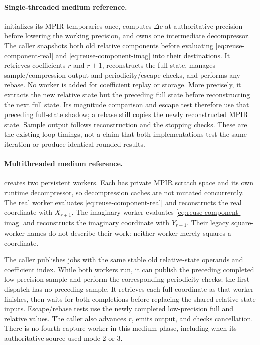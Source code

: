 \paragraph{Single-threaded medium reference.}
 initializes its MPIR
temporaries once, computes $\Delta c$ at authoritative precision before
lowering the working precision, and owns one intermediate decompressor.
The caller snapshots both old relative components before evaluating
\eqref{eq:reuse-component-real} and \eqref{eq:reuse-component-imag} into their
destinations. It retrieves coefficients $r$ and $r+1$, reconstructs the full
state, manages sample/compression output and periodicity/escape checks, and
performs any rebase. No worker is added for coefficient replay or storage.
More precisely, it extracts the new relative state but the preceding full
state before reconstructing the next full state. Its magnitude comparison and
escape test therefore use that preceding full-state shadow; a rebase still
copies the newly reconstructed MPIR state. Sample output follows reconstruction
and the stopping checks. These are the existing loop timings, not a claim
that both implementations test the same iteration or produce identical rounded
results.

\paragraph{Multithreaded medium reference.}
 creates two persistent
workers. Each has private MPIR scratch space and its own runtime decompressor,
so decompression caches are not mutated concurrently. The real worker evaluates
\eqref{eq:reuse-component-real} and reconstructs the real coordinate with
$X_{r+1}$. The imaginary worker evaluates \eqref{eq:reuse-component-imag} and
reconstructs the imaginary coordinate with $Y_{r+1}$. Their legacy square-worker
names do not describe their work: neither worker merely squares a coordinate.

The caller publishes jobs with the same stable old relative-state operands
and coefficient index. While both workers run, it can publish the preceding
completed low-precision sample and perform the corresponding periodicity
checks; the first dispatch has no preceding sample. It retrieves each full
coordinate as that worker finishes, then waits for both completions before
replacing the shared relative-state inputs. Escape/rebase tests use the newly
completed low-precision full and relative values. The caller also advances $r$,
emits output, and checks cancellation. There is no fourth capture worker in this medium phase,
including when its authoritative source used mode 2 or 3.

